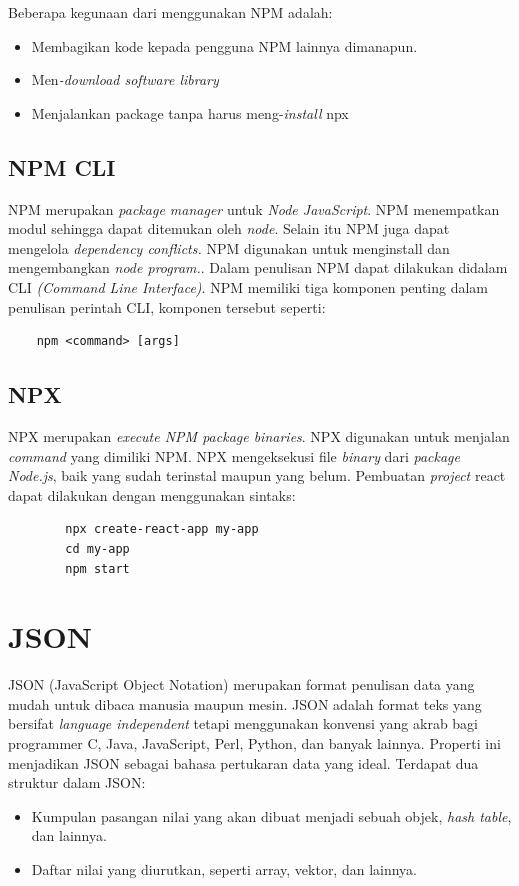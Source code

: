 Beberapa kegunaan dari menggunakan NPM adalah:
\begin{itemize}
    \item Membagikan kode kepada pengguna NPM lainnya dimanapun.
    \item Men\textit{-download software library}
    \item Menjalankan pack\textit{}age tanpa harus meng-\textit{install} npx
\end{itemize}

\subsection{NPM CLI}
NPM merupakan \textit{package manager} untuk \textit{Node JavaScript}. NPM menempatkan modul sehingga dapat ditemukan oleh \textit{node}. Selain itu NPM juga dapat mengelola \textit{dependency conflicts.} NPM digunakan untuk menginstall dan mengembangkan \textit{node program.}. Dalam penulisan NPM dapat dilakukan didalam CLI \textit{(Command Line Interface)}. NPM memiliki tiga komponen penting dalam penulisan perintah CLI, komponen tersebut seperti:
\begin{verbatim}
    npm <command> [args]
\end{verbatim}

\subsection{NPX}
NPX merupakan \textit{execute NPM package binaries}. NPX digunakan untuk menjalan \textit{command} yang dimiliki NPM. NPX mengeksekusi file \textit{binary} dari \textit{package} \textit{Node.js}, baik yang sudah terinstal maupun yang belum. Pembuatan \textit{project} react dapat dilakukan dengan menggunakan sintaks:
    \begin{verbatim}
        npx create-react-app my-app
        cd my-app
        npm start
    \end{verbatim}

\section{JSON}
JSON (JavaScript Object Notation) merupakan format penulisan data yang mudah untuk dibaca manusia maupun mesin. JSON adalah format teks yang bersifat \textit{language independent} tetapi menggunakan konvensi yang akrab bagi programmer C, Java, JavaScript, Perl, Python, dan banyak lainnya. Properti ini menjadikan JSON sebagai bahasa pertukaran data yang ideal. Terdapat dua struktur dalam JSON:
\begin{itemize}
    \item Kumpulan pasangan nilai yang akan dibuat menjadi sebuah objek, \textit{hash table}, dan lainnya.
    \item Daftar nilai yang diurutkan, seperti array, vektor, dan lainnya.
\end{itemize}
